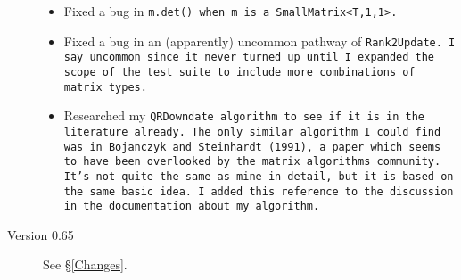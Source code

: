 \begin{description}
\begin{itemize}
\item Fixed a bug in \tt{m.det()} when \tt{m} is a \tt{SmallMatrix<T,1,1>}.

\item Fixed a bug in an (apparently) uncommon pathway of \tt{Rank2Update}.
I say uncommon since it never turned up until I expanded the scope of
the test suite to include more combinations of matrix types.

\item Researched my \tt{QRDowndate} algorithm to see if it is in the literature already.
The only similar algorithm I could find was in Bojanczyk and Steinhardt (1991), 
a paper which seems to have been overlooked by the matrix algorithms community.
It's not quite the same as mine in detail, but it is based on the same basic idea.
I added this reference to the discussion in the documentation about my algorithm.

\end{itemize}

\item[Version 0.65] See \S\ref{Changes}.

\end{description}
